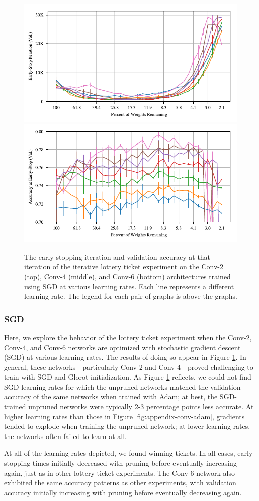 \begin{figure}
\includegraphics[width=.5\textwidth]{graphs/cifar10/conv/sgd_rate_sweep3/iteration}%
\includegraphics[width=.5\textwidth]{graphs/cifar10/conv/sgd_rate_sweep3/accuracy}
\caption{The early-stopping iteration and validation accuracy at that iteration  of the iterative lottery ticket experiment on the Conv-2 (top), Conv-4 (middle),
and Conv-6 (bottom) architectures trained using
SGD at various learning rates. Each line represents a different learning rate. The legend for each pair of graphs is above the graphs.}
\label{fig:appendix-conv-sgd}
\end{figure}

\subsubsection{SGD}

Here, we explore the behavior of the lottery ticket experiment when the Conv-2, Conv-4, and Conv-6 networks are optimized with stochastic gradient descent (SGD)
at various learning rates. The results of doing so appear in Figure \ref{fig:appendix-conv-sgd}. In general, these networks---particularly Conv-2 and Conv-4---proved
challenging to train with SGD and Glorot initialization. As Figure \ref{fig:appendix-conv-sgd} reflects, we could not find SGD learning rates for which the unpruned
networks matched the validation accuracy of the same networks when trained with Adam; at best, the SGD-trained unpruned networks were typically 2-3 percentage points
less accurate. At higher learning rates than those in Figure \ref{fig:appendix-conv-adam},
gradients tended to explode when training the unpruned network; at lower learning rates, the networks often failed to learn at all.

At all of the learning rates depicted, we found winning tickets. In all cases, early-stopping times initially decreased with pruning before eventually
increasing again, just as in other lottery ticket experiments. The Conv-6 network also exhibited the same accuracy patterns as other experiments,
with validation accuracy initially increasing with pruning before eventually decreasing again.

